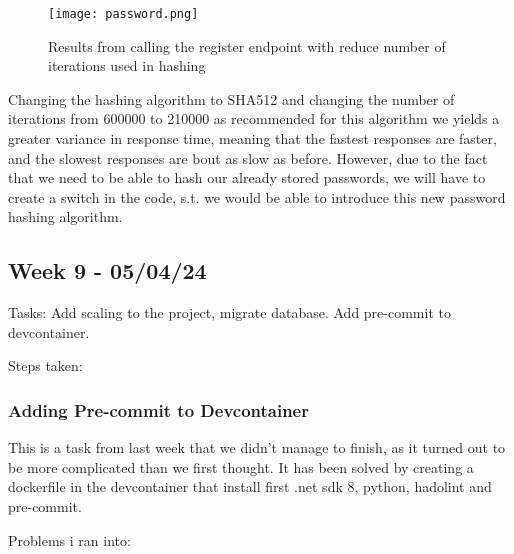\begin{figure}[H]
\centering
\texttt{[image: password.png]}
\caption{Results from calling the register endpoint with reduce number of iterations used in hashing}
\end{figure}

Changing the hashing algorithm to SHA512 and changing the number of iterations from 600000 to 210000 as recommended for this algorithm we yields a greater variance in response time, meaning that the fastest responses are faster, and the slowest responses are bout as slow as before. However, due to the fact that we need to be able to hash our already stored passwords, we will have to create a switch in the code, s.t. we would be able to introduce this new password hashing algorithm.

\subsection{Week 9 - 05/04/24}
\label{log:week9}

Tasks: Add scaling to the project, migrate database. Add pre-commit to
devcontainer.

Steps taken:

\subsubsection{Adding Pre-commit to Devcontainer}
\label{log:adding-pre-commit-to-devcontainer}

This is a task from last week that we didn't manage to finish, as it turned out to be more complicated than we first thought. It has been solved by creating a dockerfile in the devcontainer that install first .net sdk 8, python, hadolint and pre-commit.

Problems i ran into:

